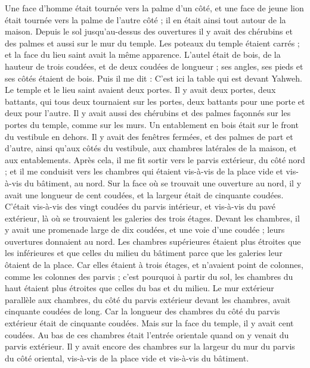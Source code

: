 \begin{multicols}{2}
Une face d'homme était tournée vers la palme d'un côté, et une face de jeune lion était tournée vers la palme de l'autre côté ; il en était ainsi tout autour de la maison.
Depuis le sol jusqu’au-dessus des ouvertures il y avait des chérubins et des palmes et aussi sur le mur du temple.
Les poteaux du temple étaient carrés ; et la face du lieu saint avait la même apparence.
L'autel était de bois, de la hauteur de trois coudées, et de deux coudées de longueur ; ses angles, ses pieds et ses côtés étaient de bois. Puis il me dit : C'est ici la table qui est devant Yahweh.
Le temple et le lieu saint avaient deux portes.
Il y avait deux portes, deux battants, qui tous deux tournaient sur les portes, deux battants pour une porte et deux pour l’autre.
Il y avait aussi des chérubins et des palmes façonnés sur les portes du temple, comme sur les murs. Un entablement en bois était sur le front du vestibule en dehors.
Il y avait des fenêtres fermées, et des palmes de part et d’autre, ainsi qu’aux côtés du vestibule, aux chambres latérales de la maison, et aux entablements.
\VerseOne{}Après cela, il me fit sortir vers le parvis extérieur, du côté nord ; et il me conduisit vers les chambres qui étaient vis-à-vis de la place vide et vis-à-vis du bâtiment, au nord.
Sur la face où se trouvait une ouverture au nord, il y avait une longueur de cent coudées, et la largeur était de cinquante coudées.
C’était vis-à-vis des vingt coudées du parvis intérieur, et vis-à-vis du pavé extérieur, là où se trouvaient les galeries des trois étages.
Devant les chambres, il y avait une promenade large de dix coudées, et une voie d’une coudée ; leurs ouvertures donnaient au nord.
Les chambres supérieures étaient plus étroites que les inférieures et que celles du milieu du bâtiment parce que les galeries leur ôtaient de la place.
Car elles étaient à trois étages, et n'avaient point de colonnes, comme les colonnes des parvis ; c’est pourquoi à partir du sol, les chambres du haut étaient plus étroites que celles du bas et du milieu.
Le mur extérieur parallèle aux chambres, du côté du parvis extérieur devant les chambres, avait cinquante coudées de long.
Car la longueur des chambres du côté du parvis extérieur était de cinquante coudées. Mais sur la face du temple, il y avait cent coudées.
Au bas de ces chambres était l’entrée orientale quand on y venait du parvis extérieur.
Il y avait encore des chambres sur la largeur du mur du parvis du côté oriental, vis-à-vis de la place vide et vis-à-vis du bâtiment.

\end{multicols}
